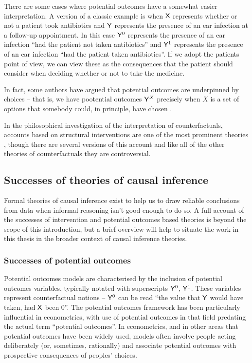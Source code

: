 There are some cases where potential outcomes have a somewhat easier interpretation. A version of a classic example is when $\mathsf{X}$ represents whether or not a patient took antibiotics and $\mathsf{Y}$ represents the presence of an ear infection at a follow-up appointment. In this case $\mathsf{Y}^0$ represents the presence of an ear infection ``had the patient not taken antibiotics'' and $\mathsf{Y}^1$ represents the presence of an ear infection ``had the patient taken antibiotics''. If we adopt the patients point of view, we can view these as the consequences that the patient should consider when deciding whether or not to take the medicine.

In fact, some authors have argued that potential outcomes are underpinned by choices -- that is, we have pootential outcomes $\mathsf{Y}^X$ precisely when $X$ is a set of options that somebody could, in principle, have chosen \citep[~pg. 4]{imbens_causal_2015}. 

In the philosophical investigation of the interpretation of counterfactuals, accounts based on structural interventions are one of the most prominent theories \citep[Section 3.3]{starr_counterfactuals_2021}, though there are several versions of this account and like all of the other theories of counterfactuals they are controversial.

\subsection{Successes of theories of causal inference}

Formal theories of causal inference exist to help us to draw reliable conclusions from data when informal reasoning isn't good enough to do so. A full account of the successes of intervention and potential outcomes based theories is beyond the scope of this introduction, but a brief overview will help to situate the work in this thesis in the broader context of causal inference theories.

\subsubsection{Successes of potential outcomes}

Potential outcomes models are characterised by the inclusion of potential outcomes variables, typically notated with superscripts $\mathsf{Y}^0$, $\mathsf{Y}^1$. These variables represent counterfactual notions -- $\mathsf{Y}^0$ can be read ``the value that $\mathsf{Y}$ would have taken, had $\mathsf{X}$ been 0''. The potential outcomes framework has been particularly influential in econometrics, with use of potential outcomes in that field predating the actual term ``potential outcomes''. In econometrics, and in other areas that potential outcomes have been widely used, models often involve people acting deliberately (or, sometimes, rationally) and associate potential outcomes with prospective consequences of peoples' choices.

